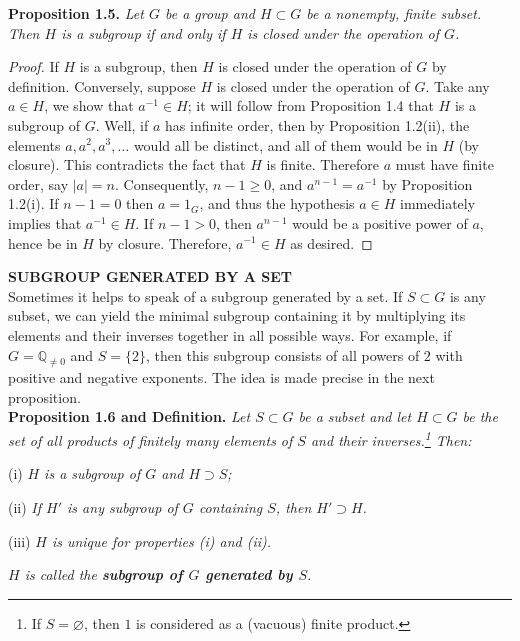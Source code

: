 \documentclass[leqno]{book}
\begin{document}
\noindent\textbf{Proposition 1.5.} \emph{Let $G$ be a group and $H\subset G$ be a nonempty, finite subset.  Then $H$ is a subgroup if and only if $H$ is closed under the operation of $G$.} %

\begin{proof}
If $H$ is a subgroup, then $H$ is closed under the operation of $G$ by definition.  Conversely, suppose $H$ is closed under the operation of $G$.  Take any $a\in H$, we show that $a^{-1}\in H$; it will follow from Proposition 1.4 that $H$ is a subgroup of $G$.  Well, if $a$ has infinite order, then by Proposition 1.2(ii), the elements $a,a^2,a^3,\dots$ would all be distinct, and all of them would be in $H$ (by closure).  This contradicts the fact that $H$ is finite.  Therefore $a$ must have finite order, say $|a|=n$.  Consequently, $n-1\geqslant 0$, and $a^{n-1}=a^{-1}$ by Proposition 1.2(i).  If $n-1=0$ then $a=1_G$, and thus the hypothesis $a\in H$ immediately implies that $a^{-1}\in H$.  If $n-1>0$, then $a^{n-1}$ would be a positive power of $a$, hence be in $H$ by closure.  Therefore, $a^{-1}\in H$ as desired.
\end{proof}

\noindent\textbf{SUBGROUP GENERATED BY A SET}\\

\noindent Sometimes it helps to speak of a subgroup generated by a set.  If $S\subset G$ is any subset, we can yield the minimal subgroup containing it by multiplying its elements and their inverses together in all possible ways.  For example, if $G=\mathbb Q_{\ne 0}$ and $S=\{2\}$, then this subgroup consists of all powers of $2$ with positive and negative exponents.  The idea is made precise in the next proposition.\\

\noindent\textbf{Proposition 1.6 and Definition.} \emph{Let $S\subset G$ be a subset and let $H\subset G$ be the set of all products of finitely many elements of $S$ and their inverses.\footnote{If $S=\varnothing$, then $1$ is considered as a (vacuous) finite product.}  Then:} %

(i) \emph{$H$ is a subgroup of $G$ and $H\supset S$;}

(ii) \emph{If $H'$ is any subgroup of $G$ containing $S$, then $H'\supset H$.}

(iii) \emph{$H$ is unique for properties (i) and (ii).}

\emph{$H$ is called the \textbf{subgroup of $G$ generated by $S$}.}
\end{document}
